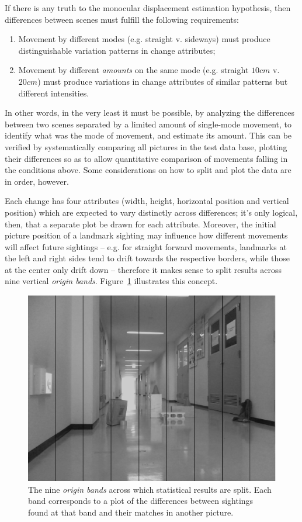 \documentclass[twocolumn, 9pt]{jsproceedings}
\begin{document}
If there is any truth to the monocular displacement estimation hypothesis, then differences between scenes must fulfill the following requirements:

\begin{enumerate}
\item Movement by different modes (e.g. straight v. sideways) must produce distinguishable variation patterns in change attributes;
\item Movement by different {\it amounts} on the same mode (e.g. straight \(10cm\) v. \(20cm\)) must produce variations in change attributes of similar patterns but different intensities.
\end{enumerate}

In other words, in the very least it must be possible, by analyzing the differences between two scenes separated by a limited amount of single-mode movement, to identify what was the mode of movement, and estimate its amount. This can be verified by systematically comparing all pictures in the test data base, plotting their differences so as to allow quantitative comparison of movements falling in the conditions above. Some considerations on how to split and plot the data are in order, however.

Each change has four attributes (width, height, horizontal position and vertical position) which are expected to vary distinctly across differences; it's only logical, then, that a separate plot be drawn for each attribute. Moreover, the initial picture position of a landmark sighting may influence how different movements will affect future sightings -- e.g. for straight forward movements, landmarks at the left and right sides tend to drift towards the respective borders, while those at the center only drift down -- therefore it makes sense to split results across nine vertical {\it origin bands}. Figure~\ref{fig:bands} illustrates this concept.

\begin{figure}[h!]
\includegraphics[width=\columnwidth]{bands.eps}
\caption{The nine {\it origin bands} across which statistical results are split. Each band corresponds to a plot of the differences between sightings found at that band and their matches in another picture.}
\label{fig:bands}
\end{figure}
\end{document}
